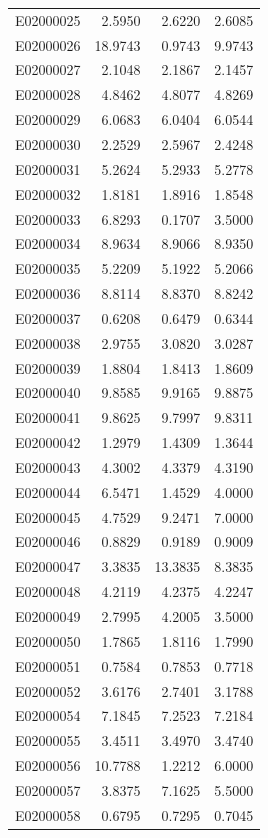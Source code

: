 \documentclass[11pt, a4paper]{article}
\begin{document}
\begin{longtable}{lrrr}
E02000025 & 2.5950 & 2.6220 & 2.6085 \\
E02000026 & 18.9743 & 0.9743 & 9.9743 \\
E02000027 & 2.1048 & 2.1867 & 2.1457 \\
E02000028 & 4.8462 & 4.8077 & 4.8269 \\
E02000029 & 6.0683 & 6.0404 & 6.0544 \\
E02000030 & 2.2529 & 2.5967 & 2.4248 \\
E02000031 & 5.2624 & 5.2933 & 5.2778 \\
E02000032 & 1.8181 & 1.8916 & 1.8548 \\
E02000033 & 6.8293 & 0.1707 & 3.5000 \\
E02000034 & 8.9634 & 8.9066 & 8.9350 \\
E02000035 & 5.2209 & 5.1922 & 5.2066 \\
E02000036 & 8.8114 & 8.8370 & 8.8242 \\
E02000037 & 0.6208 & 0.6479 & 0.6344 \\
E02000038 & 2.9755 & 3.0820 & 3.0287 \\
E02000039 & 1.8804 & 1.8413 & 1.8609 \\
E02000040 & 9.8585 & 9.9165 & 9.8875 \\
E02000041 & 9.8625 & 9.7997 & 9.8311 \\
E02000042 & 1.2979 & 1.4309 & 1.3644 \\
E02000043 & 4.3002 & 4.3379 & 4.3190 \\
E02000044 & 6.5471 & 1.4529 & 4.0000 \\
E02000045 & 4.7529 & 9.2471 & 7.0000 \\
E02000046 & 0.8829 & 0.9189 & 0.9009 \\
E02000047 & 3.3835 & 13.3835 & 8.3835 \\
E02000048 & 4.2119 & 4.2375 & 4.2247 \\
E02000049 & 2.7995 & 4.2005 & 3.5000 \\
E02000050 & 1.7865 & 1.8116 & 1.7990 \\
E02000051 & 0.7584 & 0.7853 & 0.7718 \\
E02000052 & 3.6176 & 2.7401 & 3.1788 \\
E02000054 & 7.1845 & 7.2523 & 7.2184 \\
E02000055 & 3.4511 & 3.4970 & 3.4740 \\
E02000056 & 10.7788 & 1.2212 & 6.0000 \\
E02000057 & 3.8375 & 7.1625 & 5.5000 \\
E02000058 & 0.6795 & 0.7295 & 0.7045 \\

\end{longtable}
\end{document}
